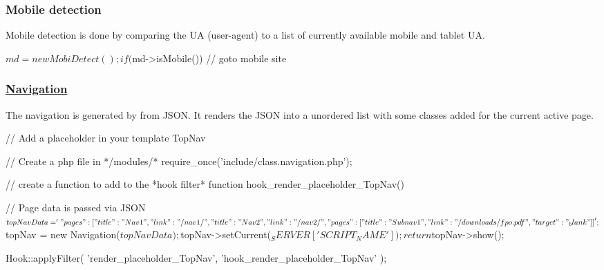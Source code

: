 \subsubsection*{Mobile detection}

Mobile detection is done by comparing the U\-A (user-\/agent) to a list of currently available mobile and tablet U\-A. \begin{DoxyVerb}$md = new MobiDetect();

if ($md->isMobile()) {
    // goto mobile site
}
\end{DoxyVerb}


\subsubsection*{\hyperlink{class_navigation}{Navigation}}

The navigation is generated by from J\-S\-O\-N. It renders the J\-S\-O\-N into a unordered list with some classes added for the current active page. \begin{DoxyVerb}// Add a placeholder in your template
{{ TopNav }}

// Create a php file in */modules/*
require_once('include/class.navigation.php');

// create a function to add to the *hook filter*
function hook_render_placeholder_TopNav() {

    // Page data is passed via JSON
    $topNavData = '{
        "pages": [
            {
                "title": "Nav 1",
                "link": "/nav1/"
            }, {
                "title": "Nav 2",
                "link": "/nav2/",
                "pages": [
                    {
                        "title": "Subnav 1",
                        "link": "/downloads/fpo.pdf",
                        "target": "_blank"
                    }
                ]
            }
        ]
    }';

    $topNav = new Navigation($topNavData);
    $topNav->setCurrent($_SERVER['SCRIPT_NAME']);

    return $topNav->show();
}

Hook::applyFilter(
    'render_placeholder_TopNav',
    'hook_render_placeholder_TopNav'
);\end{DoxyVerb}
 